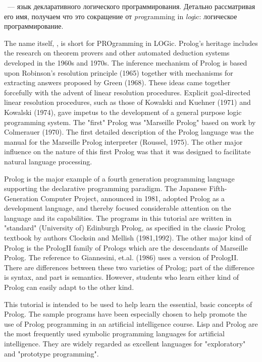 
\prolog\ --- язык декларативного логического программирования. Детально
рассматривая его имя, получаем что это сокращение от \emph{pro}gramming in
\emph{log}ic: логическое программирование.

The name itself, \prolog, is short for PROgramming in LOGic. Prolog's heritage includes the
research on theorem provers and other automated deduction systems developed in
the 1960s and 1970s. The inference mechanism of Prolog is based upon Robinson's
resolution principle (1965) together with mechanisms for extracting answers
proposed by Green (1968). These ideas came together forcefully with the advent
of linear resolution procedures. Explicit goal-directed linear resolution
procedures, such as those of Kowalski and Kuehner (1971) and Kowalski (1974),
gave impetus to the development of a general purpose logic programming system.
The "first" Prolog was "Marseille Prolog" based on work by Colmerauer (1970).
The first detailed description of the Prolog language was the manual for the
Marseille Prolog interpreter (Roussel, 1975). The other major influence on the
nature of this first Prolog was that it was designed to facilitate natural
language processing.

Prolog is the major example of a fourth generation programming language
supporting the declarative programming paradigm. The Japanese Fifth-Generation
Computer Project, announced in 1981, adopted Prolog as a development language,
and thereby focused considerable attention on the language and its capabilities.
The programs in this tutorial are written in "standard" (University of)
Edinburgh Prolog, as specified in the classic Prolog textbook by authors
Clocksin and Mellish (1981,1992). The other major kind of Prolog is the PrologII
family of Prologs which are the descendants of Marseille Prolog. The reference
to Giannesini, et.al. (1986) uses a version of PrologII. There are differences
between these two varieties of Prolog; part of the difference is syntax, and
part is semantics. However, students who learn either kind of Prolog can easily
adapt to the other kind.

This tutorial is intended to be used to help learn the essential, basic concepts
of Prolog. The sample programs have been especially chosen to help promote the
use of Prolog programming in an artificial intelligence course. Lisp and Prolog
are the most frequently used symbolic programming languages for artificial
intelligence. They are widely regarded as excellent languages for "exploratory"
and "prototype programming".

